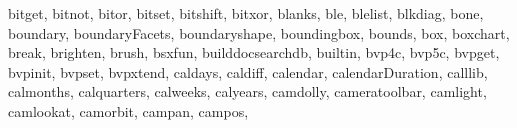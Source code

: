 {{        bitget,%
        bitnot,%
        bitor,%
        bitset,%
        bitshift,%
        bitxor,%
        blanks,%
        ble,%
        blelist,%
        blkdiag,%
        bone,%
        boundary,%
        boundaryFacets,%
        boundaryshape,%
        boundingbox,%
        bounds,%
        box,%
        boxchart,%
        break,%
        brighten,%
        brush,%
        bsxfun,%
        builddocsearchdb,%
        builtin,%
        bvp4c,%
        bvp5c,%
        bvpget,%
        bvpinit,%
        bvpset,%
        bvpxtend,%
        caldays,%
        caldiff,%
        calendar,%
        calendarDuration,%
        calllib,%
        calmonths,%
        calquarters,%
        calweeks,%
        calyears,%
        camdolly,%
        cameratoolbar,%
        camlight,%
        camlookat,%
        camorbit,%
        campan,%
        campos,%
}}
